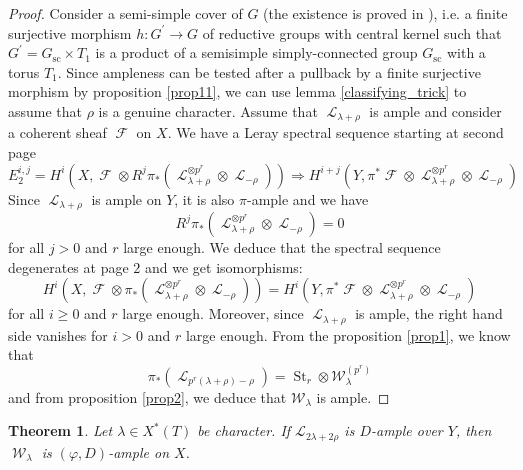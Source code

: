 \documentclass[11pt]{amsart}
\numberwithin{subsection}{section}
\numberwithin{figure}{section}
\numberwithin{table}{section}
\theoremstyle{1}
\newtheorem{theorem}{Theorem}[section]
\theoremstyle{2}
\DeclareMathOperator{\St}{St}
\DeclareMathOperator{\Lc}{\mathcal{L}}
\DeclareMathOperator{\Fc}{\mathcal{F}}
\DeclareMathOperator{\W}{\mathcal{W}}
\begin{document}
\begin{proof}
Consider a semi-simple cover of $G$ (the existence is proved in \cite{MR2015057}), i.e. a finite surjective morphism $h : G^\prime \rightarrow G$ of reductive groups with central kernel such that $G^\prime = G_{\text{sc}} \times T_1$ is a product of a semisimple simply-connected group $G_{\text{sc}}$ with a torus $T_1$. Since ampleness can be tested after a pullback by a finite surjective morphism by proposition \ref{prop11}, we can use lemma \ref{classifying_trick} to assume that $\rho$ is a genuine character. Assume that $\Lc_{\lambda+\rho}$ is ample and consider a coherent sheaf $\Fc$ on $X$. We have a Leray spectral sequence starting at second page
\begin{equation*}
E_2^{i,j} = H^i(X,\Fc \otimes R^j\pi_*( \Lc_{\lambda+\rho}^{\otimes p^r} \otimes \Lc_{-\rho} ) ) \Rightarrow H^{i+j}(Y,\pi^*\Fc \otimes \Lc_{\lambda+\rho}^{\otimes p^r} \otimes \Lc_{-\rho} )
\end{equation*}
Since $\Lc_{\lambda+\rho}$ is ample on $Y$, it is also $\pi$-ample and we have 
\begin{equation*}
R^j\pi_*( \Lc_{\lambda+\rho}^{\otimes p^r} \otimes \Lc_{-\rho} ) = 0
\end{equation*}
for all $j>0$ and $r$ large enough. We deduce that the spectral sequence degenerates at page $2$ and we get isomorphisms:
\begin{equation*}
H^i(X,\Fc \otimes \pi_*( \Lc_{\lambda+\rho}^{\otimes p^r} \otimes \Lc_{-\rho} ) ) = H^{i}(Y,\pi^*\Fc \otimes \Lc_{\lambda+\rho}^{\otimes p^r} \otimes \Lc_{-\rho} )
\end{equation*}
for all $i\geq 0$ and $r$ large enough. Moreover, since $\Lc_{\lambda+\rho}$ is ample, the right hand side vanishes for $i>0$ and $r$ large enough. From the proposition \ref{prop1}, we know that 
\begin{equation*}
\pi_*(\Lc_{p^r(\lambda+\rho)-\rho}) = \St_r \otimes \mathcal{W}_{\lambda}^{(p^r)}
\end{equation*} 
and from proposition \ref{prop2}, we deduce that $\mathcal{W}_{\lambda}$ is ample.
\end{proof}
\begin{theorem}\label{th2}
Let $\lambda \in X^*(T)$ be character. If $\mathcal{L}_{2\lambda+2\rho}$ is $D$-ample over $Y$, then $\W_{\lambda}$ is $(\varphi,D)$-ample on $X$.
\end{theorem}
\end{document}

